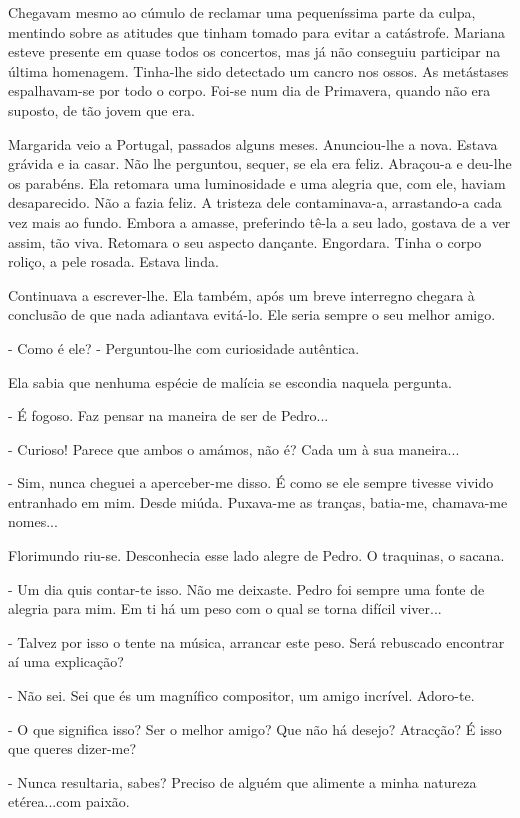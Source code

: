 Chegavam mesmo ao cúmulo de reclamar uma pequeníssima parte da culpa,
mentindo sobre as atitudes que tinham tomado para evitar a catástrofe.
Mariana esteve presente em quase todos os concertos, mas já não
conseguiu participar na última homenagem. Tinha-lhe sido detectado um
cancro nos ossos. As metástases espalhavam-se por todo o corpo. Foi-se
num dia de Primavera, quando não era suposto, de tão jovem que era.

Margarida veio a Portugal, passados alguns meses. Anunciou-lhe a nova.
Estava grávida e ia casar. Não lhe perguntou, sequer, se ela era feliz.
Abraçou-a e deu-lhe os parabéns. Ela retomara uma luminosidade e uma
alegria que, com ele, haviam desaparecido. Não a fazia feliz. A tristeza
dele contaminava-a, arrastando-a cada vez mais ao fundo. Embora a
amasse, preferindo tê-la a seu lado, gostava de a ver assim, tão viva.
Retomara o seu aspecto dançante. Engordara. Tinha o corpo roliço, a pele
rosada. Estava linda.

Continuava a escrever-lhe. Ela também, após um breve interregno chegara
à conclusão de que nada adiantava evitá-lo. Ele seria sempre o seu
melhor amigo.

- Como é ele? - Perguntou-lhe com curiosidade autêntica.

Ela sabia que nenhuma espécie de malícia se escondia naquela pergunta.

- É fogoso. Faz pensar na maneira de ser de Pedro...

- Curioso! Parece que ambos o amámos, não é? Cada um à sua maneira...

- Sim, nunca cheguei a aperceber-me disso. É como se ele sempre tivesse
vivido entranhado em mim. Desde miúda. Puxava-me as tranças, batia-me,
chamava-me nomes...

Florimundo riu-se. Desconhecia esse lado alegre de Pedro. O traquinas, o
sacana.

- Um dia quis contar-te isso. Não me deixaste. Pedro foi sempre uma
fonte de alegria para mim. Em ti há um peso com o qual se torna difícil
viver...

- Talvez por isso o tente na música, arrancar este peso. Será rebuscado
encontrar aí uma explicação?

- Não sei. Sei que és um magnífico compositor, um amigo incrível.
Adoro-te.

- O que significa isso? Ser o melhor amigo? Que não há desejo? Atracção?
É isso que queres dizer-me?

- Nunca resultaria, sabes? Preciso de alguém que alimente a minha
natureza etérea...com paixão.

